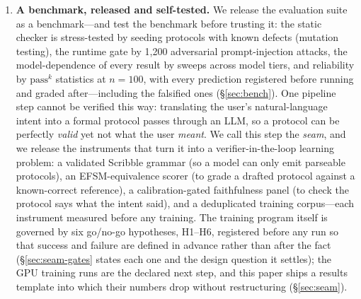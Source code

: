 \documentclass{article}
\begin{document}
\begin{enumerate}
\item \textbf{A benchmark, released and self-tested.} We release the evaluation suite as a benchmark---and test the benchmark before trusting it: the static checker is stress-tested by seeding protocols with known defects (mutation testing), the runtime gate by 1{,}200 adversarial prompt-injection attacks, the model-dependence of every result by sweeps across model tiers, and reliability by $\mathrm{pass}^k$ statistics at $n{=}100$, with every prediction registered before running and graded after---including the falsified ones (\S\ref{sec:bench}). One pipeline step cannot be verified this way: translating the user's natural-language intent into a formal protocol passes through an LLM, so a protocol can be perfectly \emph{valid} yet not what the user \emph{meant}. We call this step the \emph{seam}, and we release the instruments that turn it into a verifier-in-the-loop learning problem: a validated Scribble grammar (so a model can only emit parseable protocols), an EFSM-equivalence scorer (to grade a drafted protocol against a known-correct reference), a calibration-gated faithfulness panel (to check the protocol says what the intent said), and a deduplicated training corpus---each instrument measured before any training. The training program itself is governed by six go/no-go hypotheses, H1--H6, registered before any run so that success and failure are defined in advance rather than after the fact (\S\ref{sec:seam-gates} states each one and the design question it settles); the GPU training runs are the declared next step, and this paper ships a results template into which their numbers drop without restructuring (\S\ref{sec:seam}).
\end{enumerate}
\end{document}
